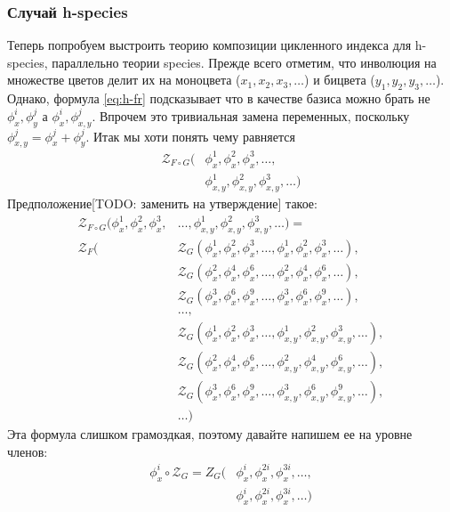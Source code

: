 \subsubsection{Случай h-species}
Теперь попробуем выстроить теорию композиции цикленного индекса для h-species,
параллельно теории species. Прежде всего отметим, что инволюция на множестве
цветов делит их на моноцвета ($x_1, x_2, x_3, \dots$) и бицвета ($y_1, y_2,
y_3, \dots$). Однако, формула \ref{eq:h-fr} подсказывает что в качестве базиса
можно брать не $\phi_x^i, \phi_y^j$ а $\phi_x^i, \phi_{x,y}^j$. Впрочем это
тривиальная замена переменных, поскольку $\phi_{x,y}^j = \phi_x^j + \phi_y^j$.
Итак мы хоти понять чему равняется
\begin{equation*}
\begin{split}
\mathcal Z_{F \circ G} (&\phi_x^1, \phi_x^2, \phi_x^3, \dots, \\
						&\phi_{x,y}^1, \phi_{x,y}^2, \phi_{x,y}^3, \dots)
\end{split}
\end{equation*}
Предположение[TODO: заменить на утверждение] такое:
\begin{equation}
\begin{split}
\label{eq:h-zfg}
	\mathcal Z_{F \circ G} (\phi_x^1, \phi_x^2, \phi_x^3, &\dots, 
	\phi_{x,y}^1, \phi_{x,y}^2, \phi_{x,y}^3, \dots) = \\
	\mathcal Z_F(
		&\mathcal Z_G(\phi_x^1, \phi_x^2, \phi_x^3, \dots, 
					 \phi_x^1, \phi_x^2, \phi_x^3, \dots), \\
		&\mathcal Z_G(\phi_x^2, \phi_x^4, \phi_x^6, \dots, 
					 \phi_x^2, \phi_x^4, \phi_x^6, \dots), \\
		&\mathcal Z_G(\phi_x^3, \phi_x^6, \phi_x^9, \dots, 
					 \phi_x^3, \phi_x^6, \phi_x^9, \dots), \\
		&\dots, \\
		&\mathcal Z_G(\phi_x^1, \phi_x^2, \phi_x^3, \dots, 
					 \phi_{x,y}^1, \phi_{x,y}^2, \phi_{x,y}^3, \dots), \\
		&\mathcal Z_G(\phi_x^2, \phi_x^4, \phi_x^6, \dots, 
					 \phi_{x,y}^2, \phi_{x,y}^4, \phi_{x,y}^6, \dots), \\
		&\mathcal Z_G(\phi_x^3, \phi_x^6, \phi_x^9, \dots, 
					 \phi_{x,y}^3, \phi_{x,y}^6, \phi_{x,y}^9, \dots), \\
		&\dots
	)
\end{split}	
\end{equation}
Эта формула слишком грамоздкая, поэтому давайте напишем ее на уровне членов:
\begin{equation*}
\begin{split}
\phi_x^i \circ \mathcal Z_G = Z_G(&\phi_x^i, \phi_x^{2i}, \phi_x^{3i}, \dots, \\ 
					 			  &\phi_x^i, \phi_x^{2i}, \phi_x^{3i}, \dots)
\end{split}
\end{equation*}
